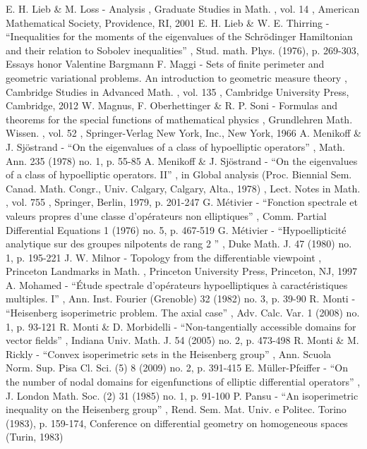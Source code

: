  E. H. Lieb \& M. Loss - Analysis , Graduate Studies in Math. , vol. 14 , American Mathematical Society, Providence, RI, 2001
 E. H. Lieb \& W. E. Thirring - “Inequalities for the moments of the eigenvalues of the Schrödinger Hamiltonian and their relation to Sobolev inequalities” , Stud. math. Phys. (1976), p. 269-303, Essays honor Valentine Bargmann
 F. Maggi - Sets of finite perimeter and geometric variational problems. An introduction to geometric measure theory , Cambridge Studies in Advanced Math. , vol. 135 , Cambridge University Press, Cambridge, 2012
 W. Magnus, F. Oberhettinger \& R. P. Soni - Formulas and theorems for the special functions of mathematical physics , Grundlehren Math. Wissen. , vol. 52 , Springer-Verlag New York, Inc., New York, 1966
 A. Menikoff \& J. Sjöstrand - “On the eigenvalues of a class of hypoelliptic operators” , Math. Ann. 235 (1978) no. 1, p. 55-85
 A. Menikoff \& J. Sjöstrand - “On the eigenvalues of a class of hypoelliptic operators. II” , in Global analysis (Proc. Biennial Sem. Canad. Math. Congr., Univ. Calgary, Calgary, Alta., 1978) , Lect. Notes in Math. , vol. 755 , Springer, Berlin, 1979, p. 201-247
 G. Métivier - “Fonction spectrale et valeurs propres d’une classe d’opérateurs non elliptiques” , Comm. Partial Differential Equations 1 (1976) no. 5, p. 467-519
 G. Métivier - “Hypoellipticité analytique sur des groupes nilpotents de rang 2 ” , Duke Math. J. 47 (1980) no. 1, p. 195-221
 J. W. Milnor - Topology from the differentiable viewpoint , Princeton Landmarks in Math. , Princeton University Press, Princeton, NJ, 1997
 A. Mohamed - “Étude spectrale d’opérateurs hypoelliptiques à caractéristiques multiples. I” , Ann. Inst. Fourier (Grenoble) 32 (1982) no. 3, p. 39-90
 R. Monti - “Heisenberg isoperimetric problem. The axial case” , Adv. Calc. Var. 1 (2008) no. 1, p. 93-121
 R. Monti \& D. Morbidelli - “Non-tangentially accessible domains for vector fields” , Indiana Univ. Math. J. 54 (2005) no. 2, p. 473-498
 R. Monti \& M. Rickly - “Convex isoperimetric sets in the Heisenberg group” , Ann. Scuola Norm. Sup. Pisa Cl. Sci. (5) 8 (2009) no. 2, p. 391-415
 E. Müller-Pfeiffer - “On the number of nodal domains for eigenfunctions of elliptic differential operators” , J. London Math. Soc. (2) 31 (1985) no. 1, p. 91-100
 P. Pansu - “An isoperimetric inequality on the Heisenberg group” , Rend. Sem. Mat. Univ. e Politec. Torino (1983), p. 159-174, Conference on differential geometry on homogeneous spaces (Turin, 1983)

